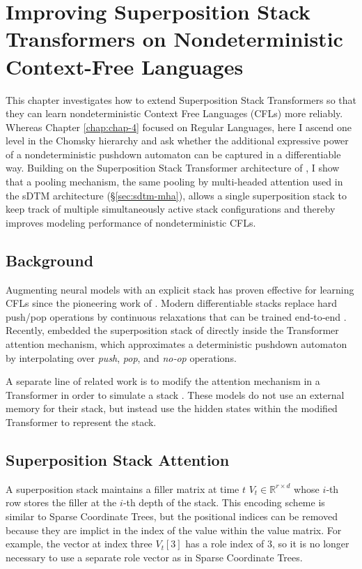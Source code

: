 \chapter{Improving Superposition Stack Transformers on Nondeterministic Context-Free Languages} \label{chap:chap-5}


This chapter investigates how to extend Superposition Stack Transformers \citep{dusell2024stack} so that they can learn nondeterministic Context Free Languages (CFLs) more reliably.  Whereas Chapter \ref{chap:chap-4} focused on Regular Languages, here I ascend one level in the Chomsky hierarchy and ask whether the additional expressive power of a nondeterministic pushdown automaton can be captured in a differentiable way.  Building on the Superposition Stack Transformer architecture of \citet{dusell2024stack}, I show that a pooling mechanism, the same pooling by multi-headed attention used in the sDTM architecture (\S\ref{sec:sdtm-mha}), allows a single superposition stack to keep track of multiple simultaneously active stack configurations and thereby improves modeling performance of nondeterministic CFLs.

\section{Background}
Augmenting neural models with an explicit stack has proven effective for learning CFLs since the pioneering work of \citet{das1992learning}.  Modern differentiable stacks replace hard push/pop operations by continuous relaxations that can be trained end‑to‑end \citep{joulin_inferring_2015, grefenstette2015learning}.  Recently, \citet{dusell2024stack} embedded the superposition stack of \citet{joulin_inferring_2015} directly inside the Transformer attention mechanism, which approximates a deterministic pushdown automaton by interpolating over \textit{push}, \textit{pop}, and \textit{no‑op} operations.

A separate line of related work is to modify the attention mechanism in a Transformer in order to simulate a stack \citep{murty_pushdown_2023, sartran2022transformer, li_transformer_2024}. These models do not use an external memory for their stack, but instead use the hidden states within the modified Transformer to represent the stack.

\section{Superposition Stack Attention}
A superposition stack maintains a filler matrix at time $t$ $V_t \in \mathbb{R}^{r\times d}$ whose $i$‑th row stores the filler at the $i$‑th depth of the stack. This encoding scheme is similar to Sparse Coordinate Trees, but the positional indices can be removed because they are implict in the index of the value within the value matrix. For example, the vector at index three $V_t[3]$ has a role index of 3, so it is no longer necessary to use a separate role vector as in Sparse Coordinate Trees.

